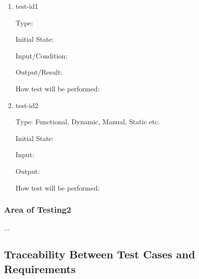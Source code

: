 \documentclass[12pt, titlepage]{article}
\begin{document}
\begin{enumerate}

\item{test-id1\\}

Type: 
					
Initial State: 
					
Input/Condition: 
					
Output/Result: 
					
How test will be performed: 
					
\item{test-id2\\}

Type: Functional, Dynamic, Manual, Static etc.
					
Initial State: 
					
Input: 
					
Output: 
					
How test will be performed: 

\end{enumerate}

\subsubsection{Area of Testing2}

...

\subsection{Traceability Between Test Cases and Requirements}


		


\end{document}
